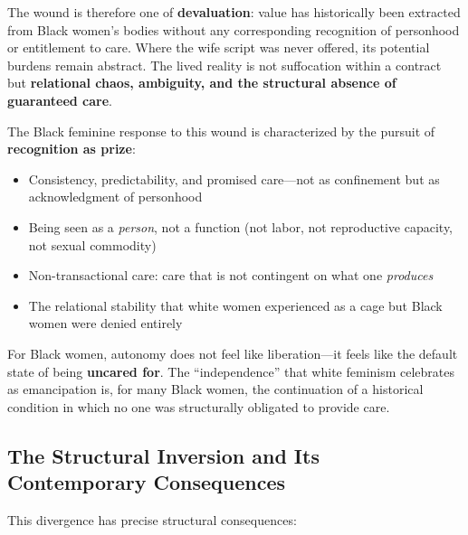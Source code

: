 \documentclass[12pt,openany]{book}
\begin{document}
The wound is therefore one of \textbf{devaluation}: value has historically been extracted from Black women's bodies without any corresponding recognition of personhood or entitlement to care. Where the wife script was never offered, its potential burdens remain abstract. The lived reality is not suffocation within a contract but \textbf{relational chaos, ambiguity, and the structural absence of guaranteed care}.

The Black feminine response to this wound is characterized by the pursuit of \textbf{recognition as prize}:

\begin{itemize}
    \item Consistency, predictability, and promised care---not as confinement but as acknowledgment of personhood
    \item Being seen as a \textit{person}, not a function (not labor, not reproductive capacity, not sexual commodity)
    \item Non-transactional care: care that is not contingent on what one \textit{produces}
    \item The relational stability that white women experienced as a cage but Black women were denied entirely
\end{itemize}

For Black women, autonomy does not feel like liberation---it feels like the default state of being \textbf{uncared for}. The ``independence'' that white feminism celebrates as emancipation is, for many Black women, the continuation of a historical condition in which no one was structurally obligated to provide care.

\subsection{The Structural Inversion and Its Contemporary Consequences}

This divergence has precise structural consequences:
\end{document}
